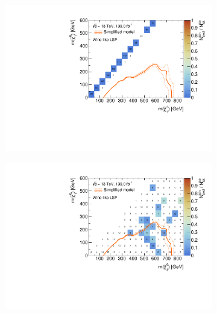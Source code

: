  \begin{figure}
	\centering
	\begin{subfigure}[b]{0.5\linewidth}
		\centering\includegraphics[width=\textwidth]{cut_wino_LSP/mchi1p_mlsp_contour}
		\caption{\label{fig:mchi1p_mlsp_contour_wino_lsp}}
	\end{subfigure}\hfill
	\begin{subfigure}[b]{0.5\linewidth}
		\centering\includegraphics[width=\textwidth]{cut_wino_LSP/mchi20_mlsp_contour}
		\caption{\label{fig:mchi20_mlsp_contour_wino_lsp}}
	\end{subfigure}\hfill
	\begin{subfigure}[b]{0.5\linewidth}

\end{subfigure}
\end{figure}
